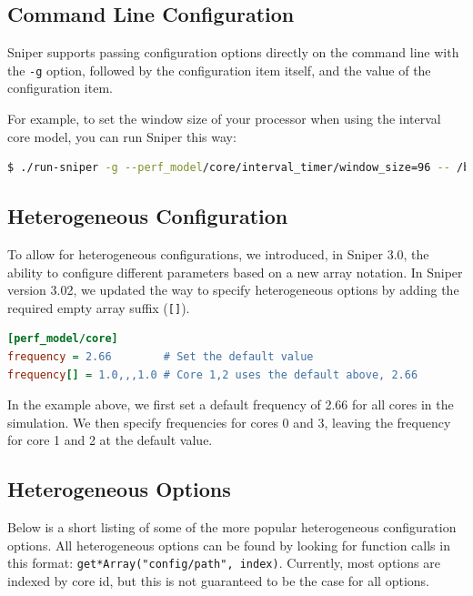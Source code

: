 \documentclass[a4paper,11pt,titlepage]{article}
\newcommand{\sourcecode}[1]{{\tt #1}}
\newcommand{\cmd}[1]{{\tt #1}}
\begin{document}
\subsection{Command Line Configuration}
\label{command-line-configuration}

Sniper supports passing configuration options directly on the command line with the \cmd{-g} option, followed by the
configuration item itself, and the value of the configuration item.

For example, to set the window size of your processor when using the interval core model, you can run Sniper this way:

\begin{lstlisting}[label=lst:options-cmdline,caption=Passing Options via the Command Line,rulecolor=\color{DarkSlateBlue},language=Bash]
$ ./run-sniper -g --perf_model/core/interval_timer/window_size=96 -- /bin/ls
\end{lstlisting}

\subsection{Heterogeneous Configuration}
\label{sec:config-hetero}

To allow for heterogeneous configurations, we introduced, in Sniper 3.0, the ability to configure
different parameters based on a new array notation.
In Sniper version 3.02, we updated the way to specify heterogeneous options by adding
the required empty array suffix (\sourcecode{[]}).
\begin{lstlisting}[label=lst:config-file-example,caption=Example configuration file,rulecolor=\color{DarkSlateBlue},language=ini]
[perf_model/core]
frequency = 2.66        # Set the default value
frequency[] = 1.0,,,1.0 # Core 1,2 uses the default above, 2.66
\end{lstlisting}
In the example above, we first set a default frequency of 2.66 for all cores in the simulation.
We then specify frequencies for cores 0 and 3, leaving the frequency for core 1 and 2 at the default value.

\subsection{Heterogeneous Options}

Below is a short listing of some of the more popular heterogeneous configuration
options. All heterogeneous options can be found by looking for function calls in this format:
\sourcecode{get*Array("config/path", index)}. Currently, most options are indexed by core id, but this
is not guaranteed to be the case for all options.
\end{document}
